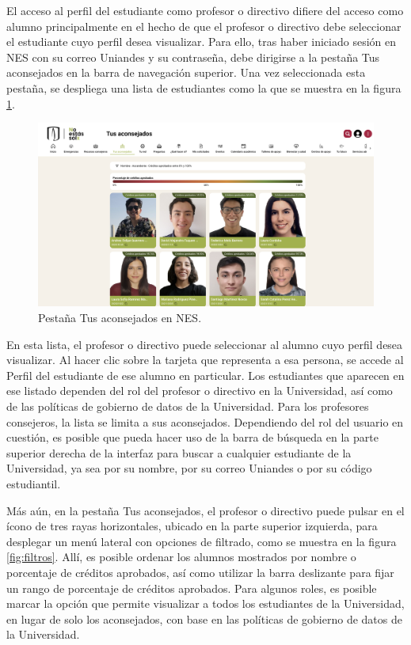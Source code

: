 El acceso al perfil del estudiante como profesor o directivo difiere del acceso como alumno principalmente en el hecho de que el profesor o directivo debe seleccionar el estudiante cuyo perfil desea visualizar. Para ello, tras haber iniciado sesión en \gls{NES} con su correo Uniandes y su contraseña, debe dirigirse a la pestaña Tus aconsejados en la barra de navegación superior. Una vez seleccionada esta pestaña, se despliega una lista de estudiantes como la que se muestra en la figura \ref{fig:tus_aconsejados}.

\begin{figure}[H]
	\centering
	\includegraphics[width=\textwidth]{assets/nes/tus_aconsejados.png}
	\caption{Pestaña Tus aconsejados en NES.}
	\label{fig:tus_aconsejados}
\end{figure}

En esta lista, el profesor o directivo puede seleccionar al alumno cuyo perfil desea visualizar. Al hacer clic sobre la tarjeta que representa a esa persona, se accede al Perfil del estudiante de ese alumno en particular. Los estudiantes que aparecen en ese listado dependen del rol del profesor o directivo en la Universidad, así como de las políticas de gobierno de datos de la Universidad. Para los profesores consejeros, la lista se limita a sus aconsejados. Dependiendo del rol del usuario en cuestión, es posible que pueda hacer uso de la barra de búsqueda en la parte superior derecha de la interfaz para buscar a cualquier estudiante de la Universidad, ya sea por su nombre, por su correo Uniandes o por su código estudiantil.

Más aún, en la pestaña Tus aconsejados, el profesor o directivo puede pulsar en el ícono de tres rayas horizontales, ubicado en la parte superior izquierda, para desplegar un menú lateral con opciones de filtrado, como se muestra en la figura \ref{fig:filtros}. Allí, es posible ordenar los alumnos mostrados por nombre o porcentaje de créditos aprobados, así como utilizar la barra deslizante para fijar un rango de porcentaje de créditos aprobados. Para algunos roles, es posible marcar la opción que permite visualizar a todos los estudiantes de la Universidad, en lugar de solo los aconsejados, con base en las políticas de gobierno de datos de la Universidad.

